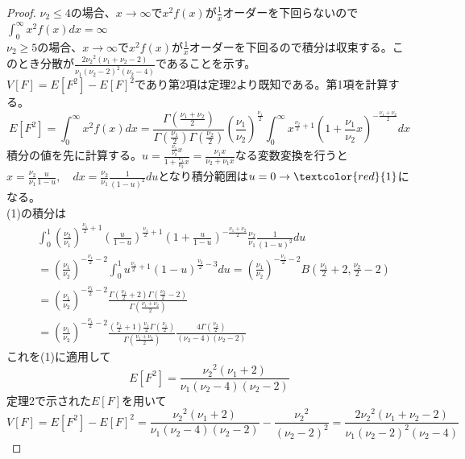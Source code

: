         \begin{proof}
            \setcounter{equation}{0}
            \quad\par
            $\nu_2 \leq 4$の場合、$x\to \infty$で$x^2f(x)$が$\frac{1}{x}$オーダーを下回らないので$\int_{0}^{\infty}{x^2f(x) dx} = \infty$\\
            $\nu_2 \geq 5$の場合、$x\to \infty$で$x^2f(x)$が$\frac{1}{x}$オーダーを下回るので積分は収束する。このとき分散が$\displaystyle \frac{2{\nu_2}^2(\nu_1+\nu_2-2)}{\nu_1(\nu_2-2)^2(\nu_2-4)}$であることを示す。\\
            $V[F] = E[F^2] - {E[F]}^2$であり第2項は定理2より既知である。第1項を計算する。
            \begin{equation}
                E[F^2] = \int_{0}^{\infty}{x^2f(x) dx} = \frac{\Gamma{\left(\frac{\nu_1+\nu_2}{2}\right)}}{\Gamma{\left(\frac{\nu_1}{2}\right)}\Gamma{\left(\frac{\nu_2}{2}\right)}}\left(\frac{\nu_1}{\nu_2}\right)^{\frac{\nu_1}{2}}\int_{0}^{\infty}{x^{\frac{\nu_2}{2}+1}\left(1+\frac{\nu_1}{\nu_2}x\right)^{-\frac{\nu_1+\nu_2}{2}} dx}
            \end{equation}
            積分の値を先に計算する。$\displaystyle u = \frac{\frac{\nu_1}{\nu_2}x}{1+\frac{\nu_1}{\nu_2}x} = \frac{\nu_1x}{\nu_2+\nu_1x}$なる変数変換を行うと$x = \frac{\nu_2}{\nu_1}\frac{u}{1-u}, \quad dx = \frac{\nu_2}{\nu_1}\frac{1}{(1-u)^2}du$となり積分範囲は$u=0\to \textcolor{red}{1}$になる。\\
            (1)の積分は
            \begin{align*}
                & \int_{0}^{1}{\left(\frac{\nu_2}{\nu_1}\right)^{\frac{\nu_1}{2}+1}\left(\frac{u}{1-u}\right)^{\frac{\nu_1}{2}+1}\left(1+\frac{u}{1-u}\right)^{-\frac{\nu_1+\nu_2}{2}}\frac{\nu_2}{\nu_1}\frac{1}{(1-u)^2} du}\\
                &= \left(\frac{\nu_1}{\nu_2}\right)^{-\frac{\nu_1}{2}-2}\int_{0}^{1}{u^{\frac{\nu_1}{2}+1}(1-u)^{\frac{\nu_2}{2}-3} du} = \left(\frac{\nu_1}{\nu_2}\right)^{-\frac{\nu_1}{2}-2}B{\left(\frac{\nu_1}{2}+2,\frac{\nu_2}{2}-2\right)}\\
                &= \left(\frac{\nu_1}{\nu_2}\right)^{-\frac{\nu_1}{2}-2}\frac{\Gamma{\left(\frac{\nu_1}{2}+2\right)}\Gamma{\left(\frac{\nu_2}{2}-2\right)}}{\Gamma{\left(\frac{\nu_1+\nu_2}{2}\right)}}\\
                &= \left(\frac{\nu_1}{\nu_2}\right)^{-\frac{\nu_1}{2}-2}\frac{\left(\frac{\nu_1}{2}+1\right)\frac{\nu_1}{2}\Gamma{\left(\frac{\nu_1}{2}\right)}}{\Gamma{\left(\frac{\nu_1+\nu_2}{2}\right)}}\frac{4\Gamma{\left(\frac{\nu_2}{2}\right)}}{(\nu_2-4)(\nu_2-2)}
            \end{align*}
            これを(1)に適用して
            \[E[F^2] = \frac{{\nu_2}^2(\nu_1+2)}{\nu_1(\nu_2-4)(\nu_2-2)}\]
            定理2で示された$E[F]$を用いて
            \[V[F] = E[F^2]-{E[F]}^2 = \frac{{\nu_2}^2(\nu_1+2)}{\nu_1(\nu_2-4)(\nu_2-2)} - \frac{{\nu_2}^2}{(\nu_2-2)^2} = \frac{2{\nu_2}^2(\nu_1+\nu_2-2)}{\nu_1(\nu_2-2)^2(\nu_2-4)}\]
        \end{proof}